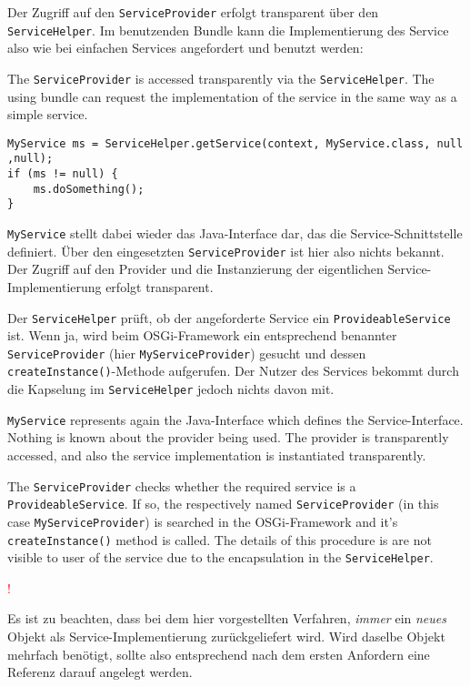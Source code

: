 \documentclass[10pt,a4paper]{scrartcl}
\newcommand{\hinweis}[1]{
\begin{framed}
\begin{minipage}[t]{0.02\textwidth}
\textcolor{red}{\Huge{\sffamily !}}
\end{minipage}
\begin{minipage}[t]{0.94\textwidth}
#1
\end{minipage}
\end{framed}
}
\providecommand{\deutsch}[1]{#1}
\providecommand{\englisch}[1]{{\sffamily #1}}
\begin{document}
\deutsch{Der Zugriff auf den \texttt{ServiceProvider} erfolgt transparent über den
\texttt{ServiceHelper}. Im benutzenden Bundle kann die Implementierung des
Service also wie bei einfachen Services angefordert und benutzt werden:}

\englisch{The \texttt{ServiceProvider} is accessed transparently via the \texttt{ServiceHelper}. The using bundle can request the implementation of the service in the same way as a simple service.}

\begin{lstlisting}
MyService ms = ServiceHelper.getService(context, MyService.class, null ,null);
if (ms != null) {
	ms.doSomething();
}
\end{lstlisting}

\deutsch{\texttt{MyService} stellt dabei wieder das Java-Interface dar, das die
Service-Schnittstelle definiert. Über den eingesetzten \texttt{ServiceProvider}
ist hier also nichts bekannt. Der Zugriff auf den Provider und die Instanzierung
der eigentlichen Service-Implementierung erfolgt transparent.

Der \texttt{ServiceHelper} prüft, ob der angeforderte Service ein
\texttt{ProvideableService} ist. Wenn ja, wird beim OSGi-Framework ein
entsprechend benannter \texttt{ServiceProvider} (hier
\texttt{MyServiceProvider}) gesucht und dessen \texttt{createInstance()}-Methode
aufgerufen. Der Nutzer des Services bekommt durch die Kapselung im
\texttt{ServiceHelper} jedoch nichts davon mit.
}

\englisch{\texttt{MyService} represents again the Java-Interface which defines
the Service-Interface. Nothing is known about the provider being used. The
provider is transparently accessed, and also the service implementation is
instantiated transparently.

The \texttt{ServiceProvider} checks whether the required service is a \texttt{ProvideableService}. If so, the respectively named \texttt{ServiceProvider}  (in this case \texttt{MyServiceProvider}) is searched in the OSGi-Framework and it's \texttt{createInstance()} method is called. The details of this procedure is are not visible to user of the service due to the encapsulation in the \texttt{ServiceHelper}.}

\deutsch{\hinweis{Es ist zu beachten, dass bei dem hier vorgestellten Verfahren,
\emph{immer} ein \emph{neues} Objekt als Service-Implementierung zurückgeliefert
wird. Wird daselbe Objekt mehrfach benötigt, sollte also entsprechend nach dem
ersten Anfordern eine Referenz darauf angelegt werden.}}
\end{document}
